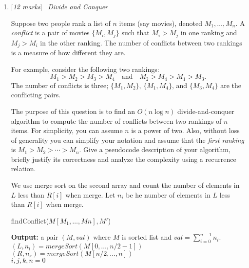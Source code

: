 \documentclass[11pt]{article}
\newcommand{\Q}[1]{\medskip\item {[{\em #1 marks\/}]}\ }
\begin{document}
\begin{enumerate}
\begin{enumerate}
\end{enumerate}

\newpage
\Q{12} {\em Divide and Conquer} 

Suppose two people rank a list of $n$ items (say movies), denoted $M_1, \dots , M_n$.
A {\it conflict} is a pair of movies $\{M_i,M_j\}$ such that $M_i > M_j$ in one
ranking and $M_j > M_i$ in the other ranking. The number of conflicts between two rankings
is a measure of how different they are. 

For example, consider the following two rankings:
\[ M_1 > M_2 > M_3 > M_4 \quad \mbox{and} \quad M_2 > M_4 > M_1 > M_3.\]
The number of conflicts is three; $\{M_1,M_2\}$, $\{M_1,M_4\}$, and $\{M_3,M_4\}$
are the conflicting pairs.

The purpose of this question is to find an $O(n \log n)$ divide-and-conquer algorithm to compute
the number of conflicts between two rankings of $n$ items. 
For simplicity, you can assume $n$ is a power of two. Also, without loss of generality you can simplify your notation and assume that the {\it first ranking} is $M_1 > M_2 > \cdots > M_n$. Give a pseudocode description of your algorithm, briefly justify its correctness and analyze the complexity using a recurrence relation.

We use merge sort on the second array and count the number of elements in $L$ less than $R[i]$ when merge. 
Let $n_i$ be he number of elements in $L$ less than $R[i]$ when merge.

\begin{algorithm}[h]
    \caption{findConflict($M[M_1,\dots, Mn], M'$)}
    \mgs{} {
        \textbf{Output:} a pair $(M, val)$ where $M$ is sorted list and $val = \sum_{i = 0}^{n - 1} n_i$.\\
        $(L, n_l) = mergeSort(M[0, \dots, n / 2 - 1])$\\
        $(R, n_r) = mergeSort(M[n / 2, \dots, n])$\\
        $i, j, k, n = 0$\\
    }


\end{algorithm}
\end{enumerate}
\end{document}
